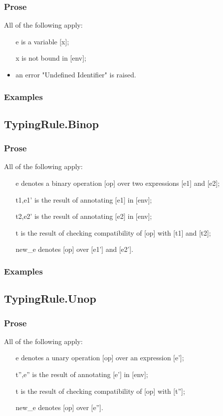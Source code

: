 \documentclass{book}
\begin{document}
  \subsubsection{Prose}
  All of the following apply:
  \begin{itemize}
  \item  [e] is a variable [x];
  \item  [x] is not bound in [env];
  \item  an error "Undefined Identifier" is raised.
  \end{itemize}

  \subsubsection{Examples}

\subsection{TypingRule.Binop}

  \subsubsection{Prose}
  All of the following apply:
  \begin{itemize}
  \item  [e] denotes a binary operation [op] over two expressions [e1] and [e2];
  \item  [t1,e1'] is the result of annotating [e1] in [env];
  \item  [t2,e2'] is the result of annotating [e2] in [env];
  \item  [t] is the result of checking compatibility of [op] with [t1] and [t2];
  \item  [new\_e] denotes [op] over [e1'] and [e2'].
  \end{itemize}

  \subsubsection{Examples}

\subsection{TypingRule.Unop}

  \subsubsection{Prose}
  All of the following apply:
  \begin{itemize}
  \item  [e] denotes a unary operation [op] over an expression [e'];
  \item  [t'',e''] is the result of annotating [e'] in [env];
  \item  [t] is the result of checking compatibility of [op] with [t''];
  \item  [new\_e] denotes [op] over [e''].
  \end{itemize}
\end{document}
